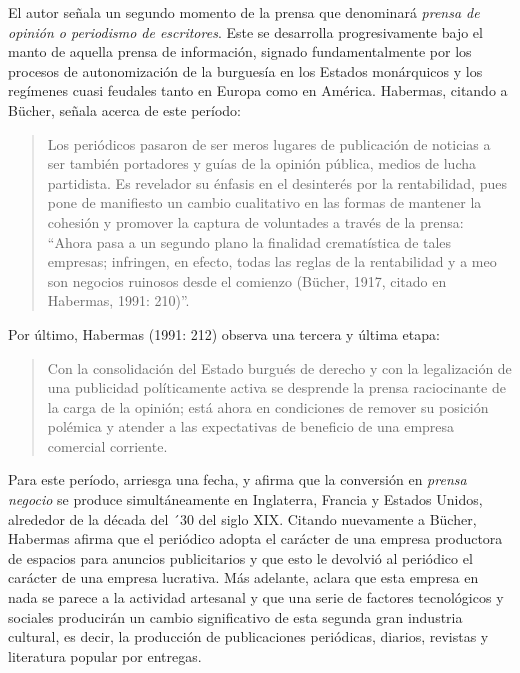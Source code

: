 El autor señala un segundo momento de la prensa que denominará \emph{prensa de opinión o periodismo de escritores}. Este se desarrolla progresivamente bajo el manto de aquella prensa de información, signado fundamentalmente por los procesos de autonomización de la burguesía en los Estados monárquicos y los regímenes cuasi feudales tanto en Europa como en América. Habermas, citando a Bücher, señala acerca de este período:

\begin{quote}
Los periódicos pasaron de ser meros lugares de publicación de noticias a ser también portadores y guías de la opinión pública, medios de lucha partidista. Es revelador su énfasis en el desinterés por la rentabilidad, pues pone de manifiesto un cambio cualitativo en las formas de mantener la cohesión y promover la captura de voluntades a través de la prensa: \enquote{Ahora pasa a un segundo plano la finalidad crematística de tales empresas; infringen, en efecto, todas las reglas de la rentabilidad y a meo son negocios ruinosos desde el comienzo (Bücher, 1917, citado en Habermas, 1991: 210)}.
\end{quote}

Por último, Habermas (1991: 212) observa una tercera y última etapa:

\begin{quote}
Con la consolidación del Estado burgués de derecho y con la legalización de una publicidad políticamente activa se desprende la prensa raciocinante de la carga de la opinión; está ahora en condiciones de remover su posición polémica y atender a las expectativas de beneficio de una empresa comercial corriente.
\end{quote}

Para este período, arriesga una fecha, y afirma que la conversión en \emph{prensa negocio} se produce simultáneamente en Inglaterra, Francia y Estados Unidos, alrededor de la década del ´30 del siglo XIX. Citando nuevamente a Bücher, Habermas afirma que el periódico adopta el carácter de una empresa productora de espacios para anuncios publicitarios y que esto le devolvió al periódico el carácter de una empresa lucrativa. Más adelante, aclara que esta empresa en nada se parece a la actividad artesanal y que una serie de factores tecnológicos y sociales producirán un cambio significativo de esta segunda gran industria cultural, es decir, la producción de publicaciones periódicas, diarios, revistas y literatura popular por entregas.

